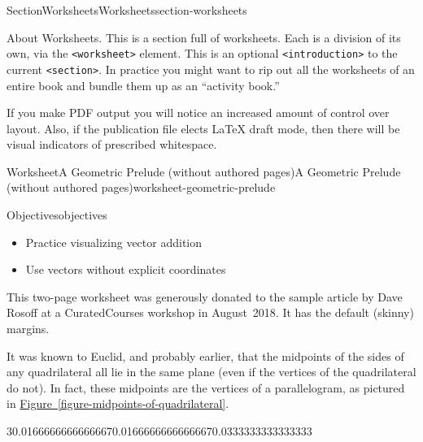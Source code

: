 \documentclass[twoside,10pt,]{article}
\newcommand{\xreffont}{\relax}
\newcommand{\mono}[1]{\texttt{#1}}
\numberwithin{equation}{section}
\begin{document}
%
%
\typeout{************************************************}
\typeout{************************************************}
%
\begin{sectionptx}{Section}{Worksheets}{}{Worksheets}{}{}{section-worksheets}
\begin{introduction}{About Worksheets.}%
This is a section full of worksheets.  Each is a division of its own, via the \mono{<worksheet>} element.  This is an optional \mono{<introduction>} to the current \mono{<section>}.  In practice you might want to rip out all the worksheets of an entire book and bundle them up as an ``activity book.''%
\par
If you make PDF output you will notice an increased amount of control over layout.  Also, if the publication file elects \LaTeX{} draft mode, then there will be visual indicators of prescribed whitespace.%
\end{introduction}%
%
%
\typeout{************************************************}
\typeout{************************************************}
%
\begin{worksheet-subsection}{Worksheet}{A Geometric Prelude (without authored pages)}{}{A Geometric Prelude (without authored pages)}{}{}{worksheet-geometric-prelude}
\begin{objectives}{Objectives}{objectives}
%
\begin{itemize}[label=\textbullet]
\item{}Practice visualizing vector addition%
\item{}Use vectors without explicit coordinates%
\end{itemize}
\end{objectives}
\begin{introduction}{}%
This two-page worksheet was generously donated to the sample article by Dave Rosoff at a CuratedCourses workshop in August~2018.  It has the default (skinny) margins.%
\par
It was known to Euclid, and probably earlier, that the midpoints of the sides of any quadrilateral all lie in the same plane (even if the vertices of the quadrilateral do not). In fact, these midpoints are the vertices of a parallelogram, as pictured in \hyperref[figure-midpoints-of-quadrilateral]{Figure~{\xreffont\ref{figure-midpoints-of-quadrilateral}}}.%
\begin{sidebyside}{3}{0.0166666666666667}{0.0166666666666667}{0.0333333333333333}%

\end{sidebyside}
\end{introduction}
\end{worksheet-subsection}
\end{sectionptx}
\end{document}
